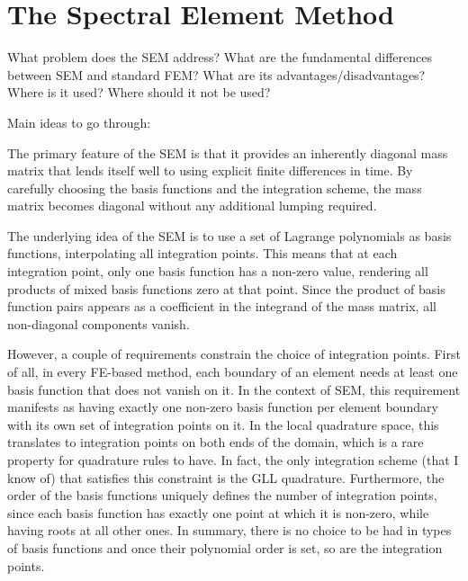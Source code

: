 %
\section{The Spectral Element Method}
\label{section:sem}
%

What problem does the SEM address?
What are the fundamental differences between SEM and standard FEM?
What are its advantages/disadvantages?
Where is it used?
Where should it not be used?

Main ideas to go through:

The primary feature of the SEM is that it provides an inherently diagonal mass matrix that
lends itself well to using explicit finite differences in time. By carefully choosing the
basis functions and the integration scheme, the mass matrix becomes diagonal without any
additional lumping required.

The underlying idea of the SEM is to use a set of Lagrange polynomials as basis functions,
interpolating all integration points.
This means that at each integration point, only one
basis function has a non-zero value, rendering all products of mixed basis functions zero
at that point. Since the product of basis function pairs appears as a coefficient in the
integrand of the mass matrix, all non-diagonal components vanish.

However, a couple of requirements constrain the choice of integration points. First of all,
in every FE-based method, each boundary of an element needs at least one basis function that does not vanish on it.
In the context of SEM, this requirement manifests as having exactly one non-zero basis function per
element boundary with its own set of integration points on it. In the local quadrature
space, this translates to integration points on both ends of the domain, which is a rare property
for quadrature rules to have. In fact, the only integration scheme (that I know of) that
satisfies this constraint is the GLL quadrature. Furthermore, the order of the basis functions
uniquely defines the number of integration points, since each basis function has exactly
one point at which it is non-zero, while having roots at all other ones. In summary, there is
no choice to be had in types of basis functions and once their polynomial order is set, so are the
integration points.

